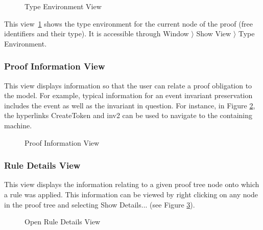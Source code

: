 \begin{figure}[!ht]
\begin{center}
	\caption{Type Environment View}
	\label{fig_ref_01_proving_perspective15}
\end{center}
\end{figure}

This view~\ref{fig_ref_01_proving_perspective15} shows the type environment for the current node of the proof (free identifiers and their type). It is accessible through \textsf{Window} $ \rangle $ \textsf{Show View} $ \rangle $ \textsf{Type Environment}.

\subsubsection{Proof Information View}

This view displays information so that the user can relate a proof obligation to the model. For example, typical information for an event invariant preservation includes the event as well as the invariant in question. For instance, in Figure \ref{fig_ref_01_proving_perspective8}, the hyperlinks \textsf{CreateToken} and \textsf{inv2} can be used to navigate to the containing machine. 

\begin{figure}[!ht]
\begin{center}
	\caption{Proof Information View}
	\label{fig_ref_01_proving_perspective8}
\end{center}
\end{figure}

\subsubsection{Rule Details View}

This view displays the information relating to a given proof tree node onto which a rule was applied.
This information can be viewed by right clicking on any node in the proof tree and selecting \textsf{Show Details...} (see Figure \ref{fig_ref_01_proving_perspective9}).

\begin{figure}[!ht]
\begin{center}
	\caption{Open Rule Details View}
	\label{fig_ref_01_proving_perspective9}
\end{center}
\end{figure}

